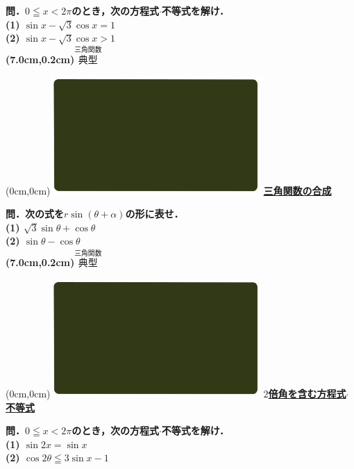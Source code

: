 \documentclass[10pt,
fleqn,
dvipdfmx,
uplatex
]{jsarticle}
\begin{document}
\Large 
\bf\boldmath 問．$0\leqq x<2\pi$のとき，次の方程式$\cdot$不等式を解け．\\
(1)  $\sin x-\sqrt 3\cos x=1$\\
(2)  $\sin x-\sqrt 3\cos x>1$\\

\at(7.0cm,0.2cm){\small\color{bradorange}$\overset{\text{三角関数}}{\text{典型}}$}


\newpage



\at(0cm,0cm){\includegraphics[width=8cm,bb=0 0 1920 1080]{./youtube/thumbnails/templates/smart_background/三角関数.jpeg}}
{\color{orange}\bf\boldmath\huge\underline{三角関数の合成}}\vspace{0.3zw}

\Large 
\bf\boldmath 問．次の式を$r\sin \left(\theta +\alpha \right)$の形に表せ．\\
(1)  $\sqrt 3\sin \theta +\cos \theta$\\
(2)  $\sin \theta -\cos \theta$\\

\at(7.0cm,0.2cm){\small\color{bradorange}$\overset{\text{三角関数}}{\text{典型}}$}


\newpage



\at(0cm,0cm){\includegraphics[width=8cm,bb=0 0 1920 1080]{./youtube/thumbnails/templates/smart_background/三角関数.jpeg}}
{\color{orange}\bf\boldmath\LARGE\underline{$2$倍角を含む方程式$\cdot$不等式}}\vspace{0.3zw}

\Large 
\bf\boldmath 問．$0\leqq x<2\pi$のとき，次の方程式$\cdot$不等式を解け．\\
(1)  $\sin 2x=\sin x$\\
(2)  $\cos 2\theta \leqq 3\sin x-1$\\
\end{document}
